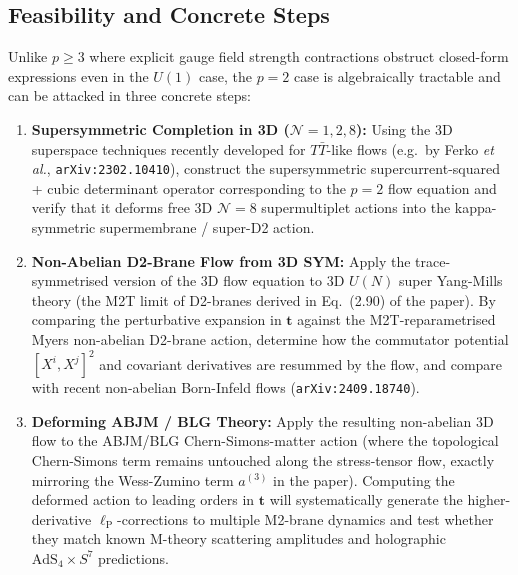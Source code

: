 \documentclass[11pt,a4paper]{article}
\begin{document}
\subsection*{Feasibility and Concrete Steps}
Unlike $p \ge 3$ where explicit gauge field strength contractions obstruct closed-form expressions even in the $U(1)$ case, the $p=2$ case is algebraically tractable and can be attacked in three concrete steps:
\begin{enumerate}
    \item \textbf{Supersymmetric Completion in 3D ($\mathcal{N}=1, 2, 8$):} Using the 3D superspace techniques recently developed for $T\bar{T}$-like flows (e.g.~by Ferko \emph{et al.}, \texttt{arXiv:2302.10410}), construct the supersymmetric supercurrent-squared + cubic determinant operator corresponding to the $p=2$ flow equation and verify that it deforms free 3D $\mathcal{N}=8$ supermultiplet actions into the kappa-symmetric supermembrane / super-D2 action.
    \item \textbf{Non-Abelian D2-Brane Flow from 3D SYM:} Apply the trace-symmetrised version of the 3D flow equation to 3D $U(N)$ super Yang-Mills theory (the M2T limit of D2-branes derived in Eq.~(2.90) of the paper). By comparing the perturbative expansion in $\boldsymbol{t}$ against the M2T-reparametrised Myers non-abelian D2-brane action, determine how the commutator potential $[X^i, X^j]^2$ and covariant derivatives are resummed by the flow, and compare with recent non-abelian Born-Infeld flows (\texttt{arXiv:2409.18740}).
    \item \textbf{Deforming ABJM / BLG Theory:} Apply the resulting non-abelian 3D flow to the ABJM/BLG Chern-Simons-matter action (where the topological Chern-Simons term remains untouched along the stress-tensor flow, exactly mirroring the Wess-Zumino term $a^{(3)}$ in the paper). Computing the deformed action to leading orders in $\boldsymbol{t}$ will systematically generate the higher-derivative $\ell_{\text{P}}$-corrections to multiple M2-brane dynamics and test whether they match known M-theory scattering amplitudes and holographic $\text{AdS}_4 \times S^7$ predictions.
\end{enumerate}
\end{document}
